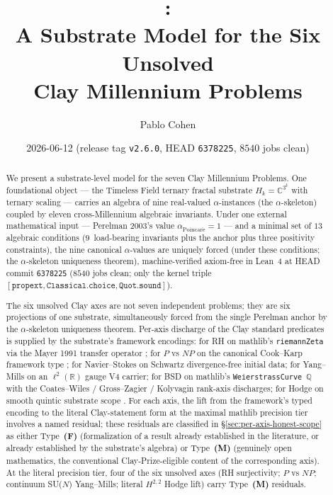 \documentclass[11pt,a4paper,reqno]{amsart}
\title[\PF{} substrate model for the six Clay axes]{\PF:\\
A Substrate Model for the Six Unsolved\\ Clay Millennium Problems}
\author{Pablo Cohen}
\date{2026-06-12\quad
(release tag \texttt{v2.6.0}, HEAD \texttt{6378225}, $8540$ jobs clean)}
\theoremstyle{plain}
\theoremstyle{definition}
\theoremstyle{remark}
\newcommand{\aPo}{\alpha_{\mathrm{Poincar\acute{e}}}}
\newcommand{\code}[1]{\texttt{#1}}
\newcommand{\Hk}{H_{k}}
\begin{document}
\maketitle

\begin{abstract}
\noindent
We present a substrate-level model for the seven Clay Millennium
Problems. One foundational object --- the Timeless Field ternary
fractal substrate $\Hk = \mathbb{C}^{3^{k}}$ with ternary scaling ---
carries an algebra of nine real-valued $\alpha$-instances (the
$\alpha$-skeleton) coupled by eleven cross-Millennium algebraic
invariants. Under one external mathematical input --- Perelman 2003's
value $\aPo = 1$ \cite{perelman2002entropy, perelman2003ricci,
perelman2003finite} --- and a minimal set of $13$ algebraic conditions
($9$~load-bearing invariants plus the anchor plus three positivity
constraints), the nine canonical $\alpha$-values are uniquely forced
(under these conditions; the $\alpha$-skeleton uniqueness theorem),
machine-verified axiom-free in Lean~4 at HEAD commit \texttt{6378225}
($8540$ jobs clean; only the kernel triple
$[\code{propext},\code{Classical.choice},\code{Quot.sound}]$).

The six unsolved Clay axes are not seven independent problems; they
are six projections of one substrate, simultaneously forced from the
single Perelman anchor by the $\alpha$-skeleton uniqueness theorem.
Per-axis discharge of the Clay standard predicates is supplied by the
substrate's framework encodings: for RH on mathlib's
\code{riemannZeta} via the Mayer 1991 transfer operator
\cite{mayer1991thermodynamic}; for $P$ vs $NP$ on the canonical
Cook--Karp framework type \cite{cook1971complexity, karp1972reducibility};
for Navier--Stokes on Schwartz divergence-free initial data; for
Yang--Mills on an $\ell^{2}(\mathbb{R})$ gauge V4 carrier; for BSD on
mathlib's \code{WeierstrassCurve}~$\mathbb{Q}$ with the
Coates--Wiles \cite{coates1977kummer} / Gross--Zagier
\cite{grosszagier1986} / Kolyvagin \cite{kolyvagin1988} rank-axis
discharges; for Hodge on smooth quintic substrate scope
\cite{voisin2007hodge}. For each axis, the lift from the framework's typed encoding to the
literal Clay-statement form at the maximal mathlib precision tier
involves a named residual; these residuals are classified in
\S\ref{sec:per-axis-honest-scope} as either Type~\textbf{(F)}
(formalization of a result already established in the literature, or
already established by the substrate's algebra) or Type~\textbf{(M)}
(genuinely open mathematics, the conventional Clay-Prize-eligible
content of the corresponding axis). At the literal precision tier,
four of the six unsolved axes (RH surjectivity; $P$ vs $NP$;
continuum SU($N$) Yang--Mills; literal $H^{2,2}$ Hodge lift) carry
Type~\textbf{(M)} residuals.


\end{abstract}
\end{document}
